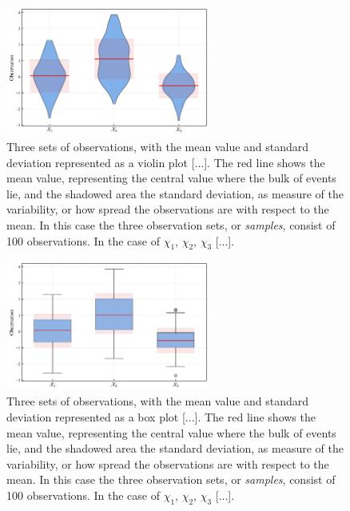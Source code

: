 \documentclass{book}
\begin{document}
\begin{figure}[ht]
    \centering
    \includegraphics[width=0.6\textwidth]{figures/chapter1/mean_std_violin.png}
    \caption{Three sets of observations, with the mean value and standard deviation represented as a violin plot [...]. The red line shows the mean value, representing the central value where the bulk of events lie, and the shadowed area the standard deviation, as measure of the variability, or how spread the observations are with respect to the mean. In this case the three observation sets, or \textit{samples}, consist of 100 observations. In the case of $\chi_1$, $\chi_2$, $\chi_3$ [...].}
    \label{fig:histogram1}
\end{figure}

\begin{figure}[ht]
    \centering
    \includegraphics[width=0.6\textwidth]{figures/chapter1/mean_std_box.png}
    \caption{Three sets of observations, with the mean value and standard deviation represented as a box plot [...]. The red line shows the mean value, representing the central value where the bulk of events lie, and the shadowed area the standard deviation, as measure of the variability, or how spread the observations are with respect to the mean. In this case the three observation sets, or \textit{samples}, consist of 100 observations. In the case of $\chi_1$, $\chi_2$, $\chi_3$ [...].}
    \label{fig:histogram1}
\end{figure}
\end{document}

